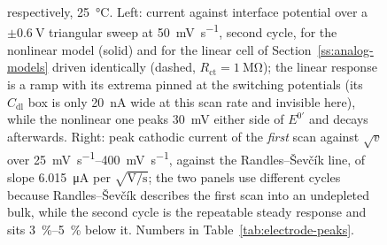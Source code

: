 \begin{figure}[htbp]
{  respectively, \SI{25}{\celsius}. Left: current against interface potential
  over a \(\pm\SI{0.6}{\volt}\) triangular sweep at \SI{50}{\milli\volt\per\second},
  second cycle, for the nonlinear model (solid) and for the linear cell of
  Section~\ref{ss:analog-models} driven identically (dashed, \(R_{\mathrm{ct}} =
  \SI{1}{\mega\ohm}\)); the linear response is a ramp with its extrema pinned at
  the switching potentials (its \(C_{\mathrm{dl}}\) box is only
  \SI{20}{\nano\ampere} wide at this scan rate and invisible here), while the
  nonlinear one peaks \SI{30}{\milli\volt} either side of \(E^{0\prime}\) and
  decays afterwards. Right: peak cathodic current of the
  \emph{first} scan against \(\sqrt{v}\) over
  \SIrange{25}{400}{\milli\volt\per\second}, against the Randles--\v{S}ev\v{c}\'ik
  line, of slope \SI{6.015}{\micro\ampere} per \(\sqrt{\si{\volt\per\second}}\);
  the two panels use different cycles because
  Randles--\v{S}ev\v{c}\'ik describes the first scan into an undepleted bulk,
  while the second cycle is the repeatable steady response and sits
  \SIrange{3}{5}{\percent} below it. Numbers in Table~\ref{tab:electrode-peaks}.}
  \label{fig:electrode-validation}
\end{figure}
